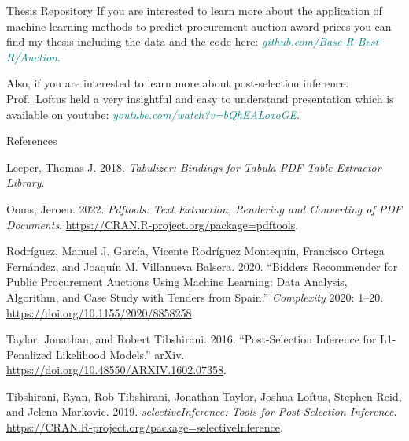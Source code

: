 \documentclass[
  11pt,
  ignorenonframetext,
]{beamer}
\newlength{\cslhangindent}
\newlength{\cslentryspacingunit} %
\newenvironment{CSLReferences}[2] %
 {%
  \setlength{\parindent}{0pt}
  \ifodd #1
  \let\oldpar\par
  \def\par{\hangindent=\cslhangindent\oldpar}
  \fi
  \setlength{\parskip}{#2\cslentryspacingunit}
 }%
 {}
\begin{document}
\begin{frame}{Thesis Repository}
\protect\hypertarget{thesis-repository}{}
If you are interested to learn more about the application of machine
learning methods to predict procurement auction award prices you can
find my thesis including the data and the code here:
\textcolor{teal}{\textit{github.com/Base-R-Best-R/Auction}}.

Also, if you are interested to learn more about post-selection
inference. Prof.~Loftus held a very insightful and easy to understand
presentation which is available on youtube:
\textcolor{teal}{\textit{youtube.com/watch?v=bQhEALoxoGE}}.
\end{frame}

\begin{frame}[allowframebreaks]{References}
\protect\hypertarget{references}{}
\hypertarget{refs}{}
\begin{CSLReferences}{1}{0}
\leavevmode{}%
Leeper, Thomas J. 2018. \emph{Tabulizer: Bindings for Tabula PDF Table
Extractor Library}.

\leavevmode{}%
Ooms, Jeroen. 2022. \emph{Pdftools: Text Extraction, Rendering and
Converting of PDF Documents}.
\url{https://CRAN.R-project.org/package=pdftools}.

\leavevmode{}%
Rodríguez, Manuel J. García, Vicente Rodríguez Montequín, Francisco
Ortega Fernández, and Joaquín M. Villanueva Balsera. 2020. {``Bidders
Recommender for Public Procurement Auctions Using Machine Learning: Data
Analysis, Algorithm, and Case Study with Tenders from Spain.''}
\emph{Complexity} 2020: 1--20.
\url{https://doi.org/10.1155/2020/8858258}.

\leavevmode{}%
Taylor, Jonathan, and Robert Tibshirani. 2016. {``Post-Selection
Inference for L1-Penalized Likelihood Models.''} arXiv.
\url{https://doi.org/10.48550/ARXIV.1602.07358}.

\leavevmode{}%
Tibshirani, Ryan, Rob Tibshirani, Jonathan Taylor, Joshua Loftus,
Stephen Reid, and Jelena Markovic. 2019. \emph{selectiveInference: Tools
for Post-Selection Inference}.
\url{https://CRAN.R-project.org/package=selectiveInference}.

\end{CSLReferences}
\end{frame}
\end{document}
